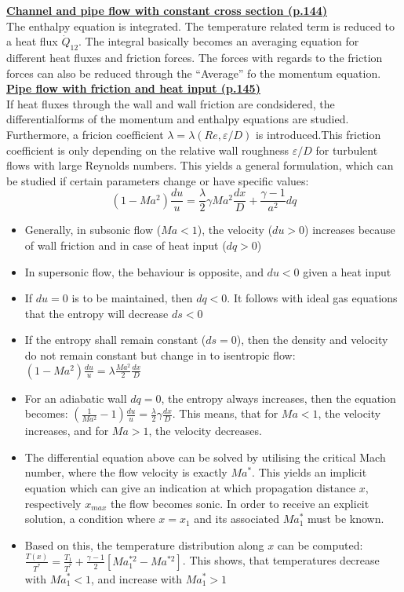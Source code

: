\documentclass[8pt, landscape, fleqn]{scrartcl}
\begin{document}
\begin{multicols*}{3}
\underline{\textbf{Channel and pipe flow with constant cross section (p.144)}}\\
The enthalpy equation is integrated. The temperature related term is reduced to a heat flux $\dot{Q}_{12}$. The integral basically becomes an averaging equation for different heat fluxes and friction forces. The forces with regards to the friction forces can also be reduced through the ``Average'' fo the momentum equation. \\

\underline{\textbf{Pipe flow with friction and heat input (p.145)}} \\
If heat fluxes through the wall and wall friction are condsidered, the differentialforms of the momentum and enthalpy equations are studied. Furthermore, a fricion coefficient $\lambda = \lambda(Re, \varepsilon/D)$ is introduced.This friction coefficient is only depending on the relative wall roughness $\varepsilon/D$ for turbulent flows with large Reynolds numbers. This yields a general formulation, which can be studied if certain parameters change or have specific values:
\begin{equation*}
    (1-Ma^2)\frac{du}{u} = \frac{\lambda}{2}\gamma Ma^2 \frac{dx}{D} + \frac{\gamma-1}{a^2} dq
\end{equation*}
\begin{itemize}
    \item Generally, in subsonic flow ($Ma < 1$), the velocity ($du > 0$) increases because of wall friction and in case of heat input ($dq > 0$) 
    \item In supersonic flow, the behaviour is opposite, and $du < 0$ given a heat input
    \item If $du = 0$ is to be maintained, then $dq < 0$. It follows with ideal gas equations that the entropy will decrease $ds < 0$
    \item If the entropy shall remain constant ($ds = 0$), then the density and velocity do not remain constant but change in to isentropic flow: $(1-Ma^2)\frac{du}{u}=\lambda \frac{Ma^2}{2}\frac{dx}{D}$ 
    \item For an adiabatic wall $dq=0$, the entropy always increases, then the equation becomes: $\left( \frac{1}{Ma^2}-1 \right)\frac{du}{u} = \frac{\lambda}{2}\gamma \frac{dx}{D}$. This means, that for $Ma <1$, the velocity increases, and for $Ma > 1$, the velocity decreases. 
    \item The differential equation above can be solved by utilising the critical Mach number, where the flow velocity is exactly $Ma^*$. This yields an implicit equation which can give an indication at which propagation distance $x$, respectively $x_{max}$ the flow becomes sonic. In order to receive an explicit solution, a condition where $x=x_1$ and its associated $Ma_1^*$ must be known.
    \item Based on this, the temperature distribution along $x$ can be computed: $\frac{T(x)}{T^*} = \frac{T_1}{T^*} + \frac{\gamma-1}{2}\left[Ma_1^{*2}-Ma^{*2}\right]$. This shows, that temperatures decrease with $Ma_1^* < 1$, and increase with $Ma_1^* > 1$
\end{itemize}


\end{multicols*}
\end{document}

